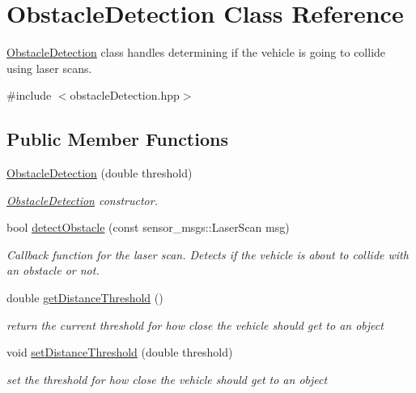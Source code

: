 \hypertarget{classObstacleDetection}{\section{Obstacle\-Detection Class Reference}
\label{classObstacleDetection}
}


\hyperlink{classObstacleDetection}{Obstacle\-Detection} class handles determining if the vehicle is going to collide using laser scans.  




{\ttfamily \#include $<$obstacle\-Detection.\-hpp$>$}

\subsection*{Public Member Functions}
\begin{DoxyCompactItemize}
\item 
\hyperlink{classObstacleDetection_a9271504043e6aeb2ae9cfc0f9ed4940e}{Obstacle\-Detection} (double threshold)
\begin{DoxyCompactList}\small\item\em \hyperlink{classObstacleDetection}{Obstacle\-Detection} constructor. \end{DoxyCompactList}\item 
bool \hyperlink{classObstacleDetection_a31418bbbef60d8dab3d5daf413be6040}{detect\-Obstacle} (const sensor\-\_\-msgs\-::\-Laser\-Scan msg)
\begin{DoxyCompactList}\small\item\em Callback function for the laser scan. Detects if the vehicle is about to collide with an obstacle or not. \end{DoxyCompactList}\item 
double \hyperlink{classObstacleDetection_a77d48fccad655af0c933ec2fc8abab7e}{get\-Distance\-Threshold} ()
\begin{DoxyCompactList}\small\item\em return the current threshold for how close the vehicle should get to an object \end{DoxyCompactList}\item 
void \hyperlink{classObstacleDetection_a2f232b84a73da8e6092b71ed0a6f0f4e}{set\-Distance\-Threshold} (double threshold)
\begin{DoxyCompactList}\small\item\em set the threshold for how close the vehicle should get to an object \end{DoxyCompactList}\end{DoxyCompactItemize}


